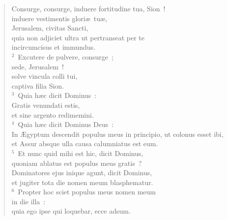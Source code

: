 \begin{flushleft}\begin{verse}\vspace{-19pt}\hspace{6pt}Consurge, consurge, induere fortitudine tua, Sion~!\\\hspace{6pt} induere vestimentis glori\ae\ tu\ae ,\\ Jerusalem, civitas Sancti,\\ quia non adjiciet ultra ut pertranseat per te\\ incircumcisus et immundus.\\
${}^{2}$~Excutere de pulvere, consurge~;\\ sede, Jerusalem~!\\ solve vincula colli tui,\\ captiva filia Sion.\\
${}^{3}$~Quia h\ae c dicit Dominus~:\\ Gratis venundati estis,\\ et sine argento redimemini.\\
${}^{4}$~Quia h\ae c dicit Dominus Deus~:\\ In \AE gyptum descendit populus meus in principio, ut colonus esset ibi,\\ et Assur absque ulla causa calumniatus est eum.\\
${}^{5}$~Et nunc quid mihi est hic, dicit Dominus,\\ quoniam ablatus est populus meus gratis~?\\ Dominatores ejus inique agunt, dicit Dominus,\\ et jugiter tota die nomen meum blasphematur.\\
${}^{6}$~Propter hoc sciet populus meus nomen meum\\ in die illa~:\\ quia ego ipse qui loquebar, ecce adsum.\end{verse}\end{flushleft}



